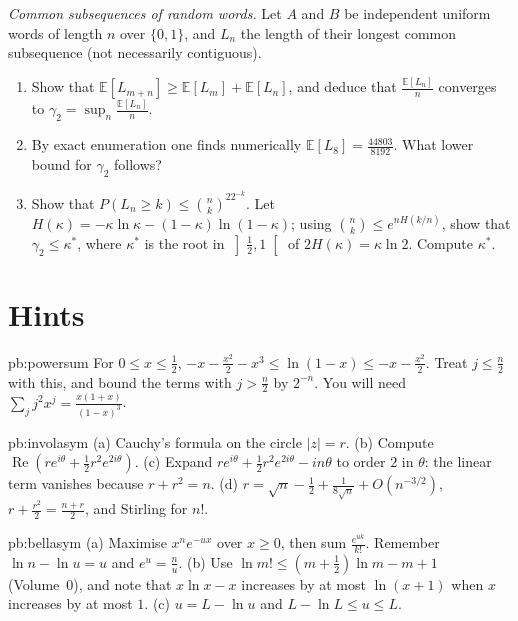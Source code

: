\begin{exercise}[$\star\star\star$]\label{pb:lcs}
\emph{Common subsequences of random words.} Let $A$ and $B$ be independent uniform words of length $n$ over $\{0,1\}$, and $L_n$ the length of their longest common
subsequence (not necessarily contiguous).
\begin{enumerate}[label=(\alph*)]
\item Show that $\mathbb E[L_{m+n}]\ge\mathbb E[L_m]+\mathbb E[L_n]$, and deduce that $\frac{\mathbb E[L_n]}n$ converges to $\gamma_2=\sup_n\frac{\mathbb E[L_n]}n$.
\item By exact enumeration one finds numerically $\mathbb E[L_8]=\frac{44803}{8192}$. What lower bound for $\gamma_2$ follows?
\item Show that $P(L_n\ge k)\le\binom nk^22^{-k}$. Let $H(\kappa)=-\kappa\ln\kappa-(1-\kappa)\ln(1-\kappa)$; using $\binom nk\le e^{nH(k/n)}$, show that $\gamma_2\le\kappa^*$, where $\kappa^*$ is the root in
$\left]\frac12,1\right[$ of $2H(\kappa)=\kappa\ln2$. Compute $\kappa^*$.
\end{enumerate}
\end{exercise}

\section{Hints}

\begin{hint}{pb:powersum}
For $0\le x\le\frac12$, $-x-\frac{x^2}2-x^3\le\ln(1-x)\le-x-\frac{x^2}2$. Treat $j\le\frac n2$ with this, and bound the terms with $j>\frac n2$ by $2^{-n}$. You will need
$\sum_jj^2x^j=\frac{x(1+x)}{(1-x)^3}$.
\end{hint}

\begin{hint}{pb:involasym}
(a) Cauchy's formula on the circle $|z|=r$. (b) Compute $\operatorname{Re}(re^{i\theta}+\frac12r^2e^{2i\theta})$. (c) Expand $re^{i\theta}+\frac12r^2e^{2i\theta}-in\theta$ to order $2$ in $\theta$: the
linear term vanishes because $r+r^2=n$. (d) $r=\sqrt n-\frac12+\frac1{8\sqrt n}+O(n^{-3/2})$, $r+\frac{r^2}2=\frac{n+r}2$, and Stirling for $n!$.
\end{hint}

\begin{hint}{pb:bellasym}
(a) Maximise $x^ne^{-ux}$ over $x\ge0$, then sum $\frac{e^{uk}}{k!}$. Remember $\ln n-\ln u=u$ and $e^u=\frac nu$. (b) Use $\ln m!\le(m+\frac12)\ln m-m+1$ (Volume~0), and note that $x\ln x-x$
increases by at most $\ln(x+1)$ when $x$ increases by at most $1$. (c) $u=L-\ln u$ and $L-\ln L\le u\le L$.
\end{hint}

